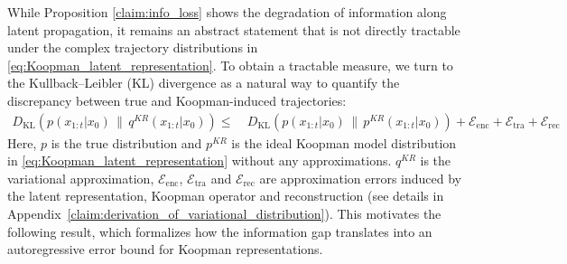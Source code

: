 \documentclass{article} %
\begin{document}
While Proposition \ref{claim:info_loss} shows the degradation of information along latent propagation, it remains an abstract statement that is not directly tractable under the complex trajectory distributions in \eqref{eq:Koopman_latent_representation}. To obtain a tractable measure, we turn to the Kullback–Leibler (KL) divergence as a natural way to quantify the discrepancy between true and Koopman-induced trajectories: 
\begin{equation}
\begin{split} \label{eq:probablistic_distribution}
    D_{\mathrm{KL}} \left( p(x_{1:t} | x_0) \,\|\, q^{KR}(x_{1:t} | x_0) \right) 
    \leq\ & D_{\mathrm{KL}}\left( p(x_{1:t} | x_0) \,\|\, p^{KR}(x_{1:t} | x_0) \right) + \mathcal{E}_{\text{enc}} + \mathcal{E}_{\text{tra}} + \mathcal{E}_{\text{rec}}
\end{split}
\end{equation}
Here, $p$ is the true distribution and $p^{KR}$ is the ideal Koopman model distribution in \eqref{eq:Koopman_latent_representation} without any approximations. $q^{KR}$ is the variational approximation, $\mathcal{E}_{\text{enc}}$, $\mathcal{E}_{\text{tra}}$ and  $\mathcal{E}_{\text{rec}}$ are approximation errors induced by the latent representation, Koopman operator and reconstruction (see details in Appendix~\ref{claim:derivation_of_variational_distribution}). This motivates the following result, which formalizes how the information gap translates into an autoregressive error bound for Koopman representations.
\end{document}

